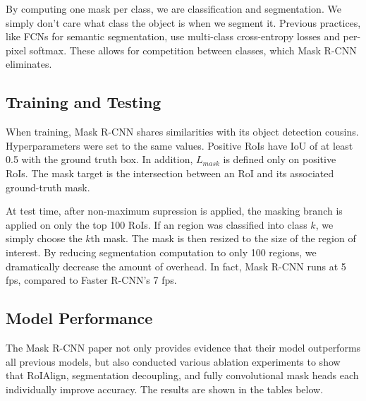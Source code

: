 \documentclass{article}
\begin{document}
By computing one mask per class, we are  classification and segmentation. We simply don't care what class the object is when we segment it. Previous practices, like FCNs for semantic segmentation, use multi-class cross-entropy losses and per-pixel softmax. These allows for competition between classes, which Mask R-CNN eliminates.

\subsection{Training and Testing}
When training, Mask R-CNN shares similarities with its object detection cousins. Hyperparameters were set to the same values. Positive RoIs have IoU of at least 0.5 with the ground truth box. In addition, $L_{mask}$ is defined only on positive RoIs. The mask target is the intersection between an RoI and its associated ground-truth mask. 

At test time, after non-maximum supression is applied, the masking branch is applied on only the top 100 RoIs. If an region was classified into class $k$, we simply choose the $k$th mask. The mask is then resized to the size of the region of interest. By reducing segmentation computation to only 100 regions, we dramatically decrease the amount of overhead. In fact, Mask R-CNN runs at 5 fps, compared to Faster R-CNN's 7 fps.

\subsection{Model Performance}
The Mask R-CNN paper not only provides evidence that their model outperforms all previous models, but also conducted various ablation experiments to show that RoIAlign, segmentation decoupling, and fully convolutional mask heads each individually improve accuracy. The results are shown in the tables below.
\end{document}
